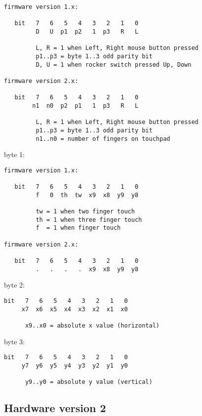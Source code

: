 \documentclass[a4paper,8pt,english]{sphinxmanual}
\begin{document}
\begin{Verbatim}[commandchars=\\\{\}]
firmware version 1.x:

   bit   7   6   5   4   3   2   1   0
         D   U  p1  p2   1  p3   R   L

         L, R = 1 when Left, Right mouse button pressed
         p1..p3 = byte 1..3 odd parity bit
         D, U = 1 when rocker switch pressed Up, Down

firmware version 2.x:

   bit   7   6   5   4   3   2   1   0
        n1  n0  p2  p1   1  p3   R   L

         L, R = 1 when Left, Right mouse button pressed
         p1..p3 = byte 1..3 odd parity bit
         n1..n0 = number of fingers on touchpad
\end{Verbatim}

byte 1:

\begin{Verbatim}[commandchars=\\\{\}]
firmware version 1.x:

   bit   7   6   5   4   3   2   1   0
         f   0  th  tw  x9  x8  y9  y8

         tw = 1 when two finger touch
         th = 1 when three finger touch
         f  = 1 when finger touch

firmware version 2.x:

   bit   7   6   5   4   3   2   1   0
         .   .   .   .  x9  x8  y9  y8
\end{Verbatim}

byte 2:

\begin{Verbatim}[commandchars=\\\{\}]
bit   7   6   5   4   3   2   1   0
     x7  x6  x5  x4  x3  x2  x1  x0

      x9..x0 = absolute x value (horizontal)
\end{Verbatim}

byte 3:

\begin{Verbatim}[commandchars=\\\{\}]
bit   7   6   5   4   3   2   1   0
     y7  y6  y5  y4  y3  y2  y1  y0

      y9..y0 = absolute y value (vertical)
\end{Verbatim}


\subsection{Hardware version 2}
\label{input/devices/elantech:hardware-version-2}
\end{document}
